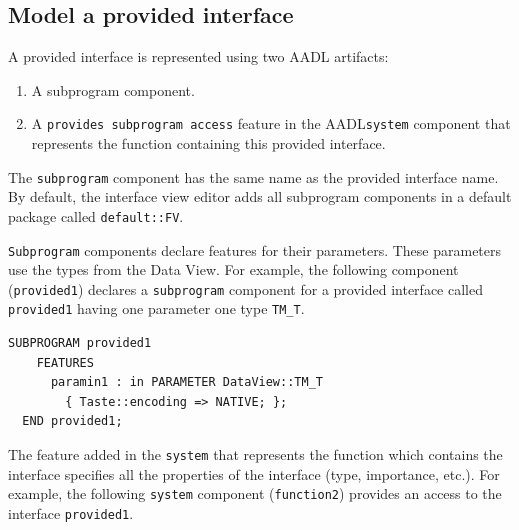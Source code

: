 \documentclass[11pt]{book}
\newcommand{\Concept}[1]{#1\xspace}
\newcommand{\aadl}{\Concept{AADL}}
\begin{document}
      \subsection{Model a provided interface}
      A provided interface is represented using two \aadl artifacts:
      \begin{enumerate}
         \item
            A subprogram component. 
         \item
            A \texttt{provides subprogram access} feature in the \aadl \texttt{system} component that represents the
            function containing this provided interface.
      \end{enumerate}

      The \texttt{subprogram} component has the same name as the provided
      interface name. By default, the interface view editor adds all subprogram
      components in a default package called \texttt{default::FV}.

      \texttt{Subprogram} components declare features for their parameters.
      These parameters use the types from the Data View. For example, the
      following component (\texttt{provided1}) declares a \texttt{subprogram}
      component for a provided interface called \texttt{provided1} having one
      parameter one type \texttt{TM\_T}.
      \begin{lstlisting}[language=aadl]
  SUBPROGRAM provided1
    FEATURES
      paramin1 : in PARAMETER DataView::TM_T
        { Taste::encoding => NATIVE; };
  END provided1;
      \end{lstlisting}


      The feature added in the \texttt{system} that represents the function
      which contains the interface specifies all the properties of the
      interface (type, importance, etc.). For example, the following
      \texttt{system} component (\texttt{function2}) provides an access to the
      interface \texttt{provided1}. 
\end{document}
